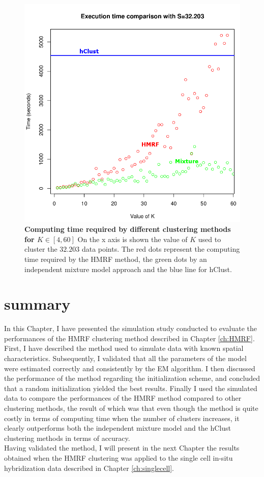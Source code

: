 	\begin{figure}[h]
\centerline{\includegraphics[width=0.8\linewidth]{gfx/chapter5/exec_time.png}}
\caption{{\bf Computing time required by different clustering methods for $K \in [4,60]$} On the x axis is shown the value of $K$ used to cluster the $32.203$ data points. The red dots represent the computing time required by the HMRF method, the green dots by an independent mixture model approach and the blue line for hClust.}
\label{fig:computing_time}
	\end{figure}
	
\section{summary}
In this Chapter, I have presented the simulation study conducted to evaluate the performances of the HMRF clustering method described in Chapter \ref{ch:HMRF}. First, I have described the method used to simulate data with known spatial characteristics. Subsequently, I validated that all the parameters of the model were estimated correctly and consistently by the EM algorithm. I then discussed the performance of the method regarding the initialization scheme, and concluded that a random initialization yielded the best results. Finally I used the simulated data to compare the performances of the HMRF method compared to other clustering methods, the result of which was that even though the method is quite costly in terms of computing time when the number of clusters increases, it clearly outperforms both the independent mixture model and the hClust clustering methods in terms of accuracy.\\

Having validated the method, I will present in the next Chapter the results obtained when the HMRF clustering was applied to the single cell in-situ hybridization data described in Chapter \ref{ch:singlecell}.





